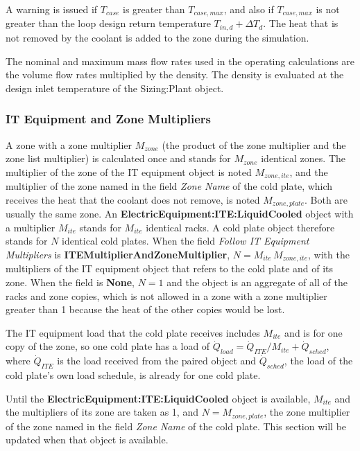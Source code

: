 A warning is issued if \(T_{case}\) is greater than \(T_{case,max}\), and also if \(T_{case,max}\) is not greater than the loop design return temperature \(T_{in,d} + \Delta T_{d}\). The heat that is not removed by the coolant is added to the zone during the simulation.

The nominal and maximum mass flow rates used in the operating calculations are the volume flow rates multiplied by the density. The density is evaluated at the design inlet temperature of the Sizing:Plant object.

\subsubsection{IT Equipment and Zone Multipliers}\label{zone-multipliers-coilcoolingitecoldplate}

A zone with a zone multiplier \(M_{zone}\) (the product of the zone multiplier and the zone list multiplier) is calculated once and stands for \(M_{zone}\) identical zones. The multiplier of the zone of the IT equipment object is noted \(M_{zone,ite}\), and the multiplier of the zone named in the field \emph{Zone Name} of the cold plate, which receives the heat that the coolant does not remove, is noted \(M_{zone,plate}\). Both are usually the same zone. An \textbf{ElectricEquipment:ITE:LiquidCooled} object with a multiplier \(M_{ite}\) stands for \(M_{ite}\) identical racks. A cold plate object therefore stands for \(N\) identical cold plates. When the field \emph{Follow IT Equipment Multipliers} is \textbf{ITEMultiplierAndZoneMultiplier}, \(N = M_{ite} \, M_{zone,ite}\), with the multipliers of the IT equipment object that refers to the cold plate and of its zone. When the field is \textbf{None}, \(N = 1\) and the object is an aggregate of all of the racks and zone copies, which is not allowed in a zone with a zone multiplier greater than 1 because the heat of the other copies would be lost.

The IT equipment load that the cold plate receives includes \(M_{ite}\) and is for one copy of the zone, so one cold plate has a load of \(\dot{Q}_{load} = \dot{Q}_{ITE} / M_{ite} + \dot{Q}_{sched}\), where \(\dot{Q}_{ITE}\) is the load received from the paired object and \(\dot{Q}_{sched}\), the load of the cold plate's own load schedule, is already for one cold plate.

Until the \textbf{ElectricEquipment:ITE:LiquidCooled} object is available, \(M_{ite}\) and the multipliers of its zone are taken as 1, and \(N = M_{zone,plate}\), the zone multiplier of the zone named in the field \emph{Zone Name} of the cold plate. This section will be updated when that object is available.


